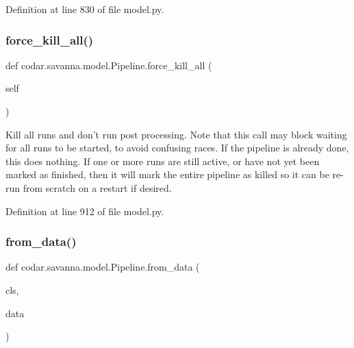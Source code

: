 Definition at line 830 of file model.\+py.

\mbox{\label{classcodar_1_1savanna_1_1model_1_1_pipeline_accc64a044c6e1929d19cbea5718fd0f7}} 
\subsubsection{\texorpdfstring{force\+\_\+kill\+\_\+all()}{force\_kill\_all()}}
{\footnotesize\ttfamily def codar.\+savanna.\+model.\+Pipeline.\+force\+\_\+kill\+\_\+all (\begin{DoxyParamCaption}\item[{}]{self }\end{DoxyParamCaption})}

\begin{DoxyVerb}Kill all runs and don't run post processing. Note that this call may
block waiting for all runs to be started, to avoid confusing races.
If the pipeline is already done, this does nothing. If one or more
runs are still active, or have not yet been marked as finished, then
it will mark the entire pipeline as killed so it can be re-run from
scratch on a restart if desired.
\end{DoxyVerb}
 

Definition at line 912 of file model.\+py.

\mbox{\label{classcodar_1_1savanna_1_1model_1_1_pipeline_abf71facf9275710199941f0f79997db2}} 
\subsubsection{\texorpdfstring{from\+\_\+data()}{from\_data()}}
{\footnotesize\ttfamily def codar.\+savanna.\+model.\+Pipeline.\+from\+\_\+data (\begin{DoxyParamCaption}\item[{}]{cls,  }\item[{}]{data }\end{DoxyParamCaption})}

